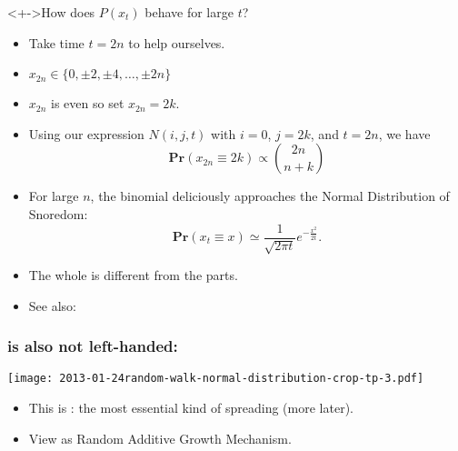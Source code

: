 \begin{frame}

  \begin{block}<+->{How does $P(x_{t})$ behave for large $t$?}
    \begin{itemize}
    \item<+->
      Take time $t=2n$ to help ourselves.
    \item<+->
      $x_{2n} \in \{0, \pm 2, \pm 4, \ldots, \pm 2n\}$
    \item<+->
      $x_{2n}$ is even so set $x_{2n} = 2k$.
    \item<+->
      Using our expression $N(i,j,t)$ with
      $i=0$, $j=2k$, and $t=2n$, we have
      $$
      \mathbf{Pr}(x_{2n} \equiv 2k) 
      \propto 
      \binom{2n}{n+k}
      $$
    \item<+->
      For large $n$, the binomial
      deliciously approaches the Normal Distribution of Snoredom:
      $$
      \mathbf{Pr}(x_{t} \equiv x) 
      \simeq
      \frac{1}{\sqrt{2\pi t}}
      e^{-\frac{x^2}{2t}}.
      $$
    \item<+-> 
      The whole is different from the parts. \hfill {}
    \item<+-> 
      See also: 
    \end{itemize}
  \end{block}

\end{frame}


\begin{frame}
  \frametitle{ is also not left-handed:}

  \begin{block}{}
    \texttt{[image: 2013-01-24random-walk-normal-distribution-crop-tp-3.pdf]}
    \begin{itemize}
    \item 
      This is : 
      the most essential kind of spreading (more later).
    \item 
    View as Random Additive Growth Mechanism.
  \end{itemize}
  \end{block}

\end{frame}


